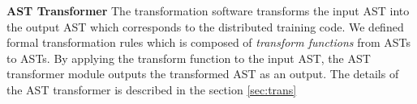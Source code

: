 \textbf{AST Transformer}
The transformation software transforms the input AST into the output AST
which corresponds to the distributed training code.
We defined formal transformation rules which is composed of
\textit{transform functions} from ASTs to ASTs.
By applying the transform function to the input AST,
the AST transformer module outputs the transformed AST as an output.
The details of the AST transformer is described in the section \ref{sec:trans}
